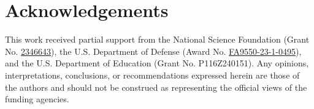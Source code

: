 \documentclass[5p,times,authoryear]{elsarticle}
\begin{document}
\section*{Acknowledgements}
This work received partial support from the National Science Foundation (Grant No. \href{https://www.nsf.gov/awardsearch/showAward?AWD_ID=2346643}{2346643}), the U.S. Department of Defense (Award No. \href{https://dtic.dimensions.ai/details/grant/grant.14525543}{FA9550-23-1-0495}), and the U.S. Department of Education (Grant No. P116Z240151). Any opinions, interpretations, conclusions, or recommendations expressed herein are those of the authors and should not be construed as representing the official views of the funding agencies.




\end{document}
